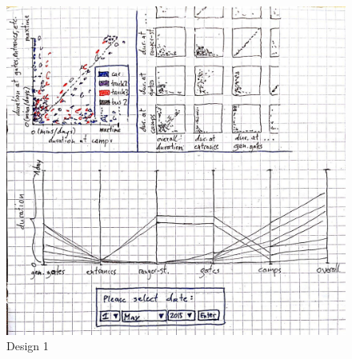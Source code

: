 \documentclass{article}
\begin{document}
\begin{figure}
	\centering
	\includegraphics[scale=.45]{Design1.jpg}
	\caption{Design 1}
	\label{fig:design1}
\end{figure}
\end{document}
